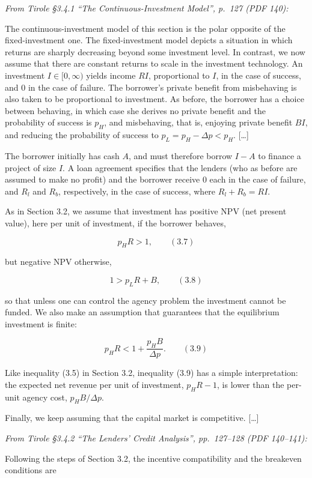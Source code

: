 \documentclass[11pt,a4paper]{article}
\begin{document}
\emph{From Tirole §3.4.1 ``The Continuous-Investment Model'', p.~127 (PDF 140):}

The continuous-investment model of this section is the polar opposite of the fixed-investment one.
The fixed-investment model depicts a situation in which returns are sharply decreasing beyond some
investment level. In contrast, we now assume that there are constant returns to scale in the
investment technology. An investment \(I \in [0, \infty)\) yields income \(RI\), proportional to
\(I\), in the case of success, and 0 in the case of failure. The borrower's private benefit from
misbehaving is also taken to be proportional to investment. As before, the borrower has a choice
between behaving, in which case she derives no private benefit and the probability of success is
\(p_H\), and misbehaving, that is, enjoying private benefit \(BI\), and reducing the probability of
success to \(p_L = p_H - \Delta p < p_H\). {[}\ldots{]}

The borrower initially has cash \(A\), and must therefore borrow \(I - A\) to finance a project of
size \(I\). A loan agreement specifies that the lenders (who as before are assumed to make no
profit) and the borrower receive 0 each in the case of failure, and \(R_l\) and \(R_b\),
respectively, in the case of success, where \(R_l + R_b = RI\).

As in Section 3.2, we assume that investment has positive NPV (net present value), here per unit of
investment, if the borrower behaves,

\[p_H R > 1, \qquad (3.7)\]

but negative NPV otherwise,

\[1 > p_L R + B, \qquad (3.8)\]

so that unless one can control the agency problem the investment cannot be funded. We also make an
assumption that guarantees that the equilibrium investment is finite:

\[p_H R < 1 + \frac{p_H B}{\Delta p}. \qquad (3.9)\]

Like inequality (3.5) in Section 3.2, inequality (3.9) has a simple interpretation: the expected net
revenue per unit of investment, \(p_H R - 1\), is lower than the per-unit agency cost,
\(p_H B/\Delta p\).

Finally, we keep assuming that the capital market is competitive. {[}\ldots{]}

\emph{From Tirole §3.4.2 ``The Lenders' Credit Analysis'', pp.~127--128 (PDF 140--141):}

Following the steps of Section 3.2, the incentive compatibility and the breakeven conditions are
\end{document}

